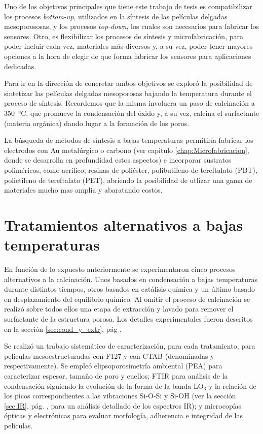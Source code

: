 	Uno de los objetivos principales que tiene este trabajo de tesis es compatibilizar los procesos \textit{bottom-up}, utilizados en la síntesis de las películas delgadas mesoporososas, y los procesos \textit{top-down}, los cuales son necesarios para fabricar los sensores. Otro, es flexibilizar los procesos de síntesis y microfabricación, para poder incluir cada vez, materiales más diversos y, a su vez, poder tener mayores opciones a la hora de elegir de que forma fabricar los sensores para aplicaciones dedicadas\cite{Doshi2000a,Wagner2013,Innocenzi2013,Soler-Illia2002a}.

	Para ir en la dirección de concretar ambos objetivos se exploró la posibilidad de sintetizar las películas delgadas mesoporosas bajando la temperatura durante el proceso de síntesis. Recordemos que la misma involucra un paso de calcinación a \SI{350}{\celsius}, que promueve la condensación del óxido y, a su vez, calcina el surfactante (materia orgánica) dando lugar a la formación de los poros.\cite{Zhang2015,Horiuchi2011,Clark2000,Zhang2005}

	La búsqueda de métodos de síntesis a bajas temperaturas permitiría fabricar los electrodos con Au metalúrgico o carbono (ver capitulo \ref{chap:Microfabricacion}, donde se desarrolla en profundidad estos aspectos) e incorporar sustratos poliméricos, como acrílico, resinas de poliéster, polibutileno de tereftalato (PBT), polietileno de tereftalato (PET), abriendo la posibilidad de utlizar una gama de materiales mucho mas amplia y abaratando costos.

\section{Tratamientos alternativos a bajas temperaturas}
	
		En función de lo expuesto anteriormente se experimentaron cinco procesos alternativos a la calcinación. Unos basados en condensación a bajas temperaturas durante distintos tiempos, otros basados en catálisis química y un último basado en desplazamiento del equilibrio químico. Al omitir el proceso de calcinación se realizó sobre todos ellos una etapa de extracción y lavado para remover el surfactante de la estructura porosa. Los detalles experimentales fueron descritos en la sección \ref{sec:cond_y_extr}, pág \pageref{sec:cond_y_extr}.

		Se realizó un trabajo sistemático de caracterización, para cada tratamiento, para películas mesoestructuradas con F127 y con CTAB (denominadas \pdmF\space y \pdmC\space respectivamente). Se empleó elipsoporosimetría ambiental (PEA) para caracterizar espesor, tamaño de poro y cuellos; FTIR para análisis de la condensación siguiendo la evolución de la forma de la banda LO$_3$ y la relación de los picos correspondientes a las vibraciones Si-O-Si y Si-OH (ver la sección \ref{sec:IR}, pág. \pageref{sec:IR}, para un análisis detallado de los espectros IR); y microcopías ópticas y electrónicas para evaluar morfología, adherencia e integridad de las películas.

